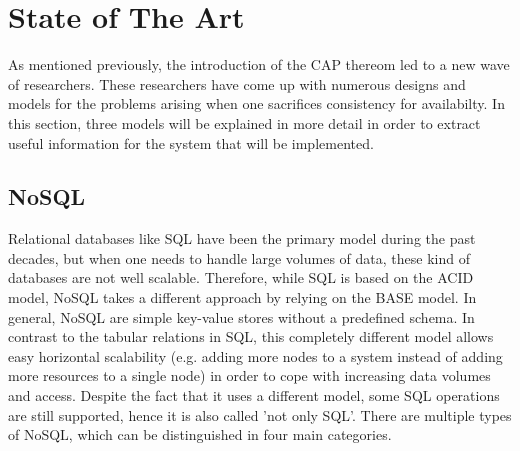 \documentclass[a4paper,12pt]{report}
\begin{document}
\section{State of The Art}\label{sec:StateOfTheArt}

As mentioned previously, the introduction of the CAP thereom led to a new wave of researchers. These researchers have come up with numerous designs and models for the problems arising when one sacrifices consistency for availabilty. In this section, three models will be explained in more detail in order to extract useful information for the system that will be implemented. 

\subsection{NoSQL}\label{subsec:NoSQL}

Relational databases like SQL have been the primary model during the past decades, but when one needs to handle large volumes of data, these kind of databases are not well scalable. Therefore, while SQL is based on the ACID model, NoSQL takes a different approach by relying on the BASE model. In general, NoSQL are simple key-value stores without a predefined schema. In contrast to the tabular relations in SQL, this completely different model allows easy horizontal scalability (e.g. adding more nodes to a system instead of adding more resources to a single node) in order to cope with increasing data volumes and access. Despite the fact that it uses a different model, some SQL operations are still supported, hence it is also called 'not only SQL'. There are multiple types of NoSQL, which can be distinguished in four main categories. 
\end{document}
